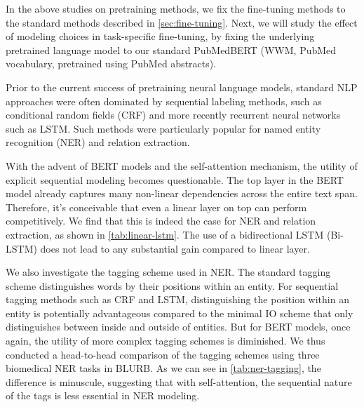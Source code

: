 \documentclass[acmlarge,screen,nonacm]{acmart}
\begin{document}
In the above studies on pretraining methods, we fix the fine-tuning methods to the standard methods described in \autoref{sec:fine-tuning}. 
Next, we will study the effect of modeling choices in task-specific fine-tuning, by fixing the underlying pretrained language model to our standard PubMedBERT (WWM, PubMed vocabulary, pretrained using PubMed abstracts). 

Prior to the current success of pretraining neural language models, standard NLP approaches were often dominated by sequential labeling methods, such as conditional random fields (CRF) and more recently recurrent neural networks such as LSTM. Such methods were particularly popular for named entity recognition (NER) and relation extraction. 


With the advent of BERT models and the self-attention mechanism, the utility of explicit sequential modeling becomes questionable. The top layer in the BERT model already captures many non-linear dependencies across the entire text span. Therefore, it's conceivable that even a linear layer on top can perform competitively. We find that this is indeed the case for NER and relation extraction, as shown in \autoref{tab:linear-lstm}. The use of a bidirectional LSTM (Bi-LSTM) does not lead to any substantial gain compared to linear layer.

We also investigate the tagging scheme used in NER. The standard tagging scheme distinguishes words by their positions within an entity. 
For sequential tagging methods such as CRF and LSTM, distinguishing the position within an entity is potentially advantageous compared to the minimal IO scheme that only distinguishes between inside and outside of entities. But for BERT models, once again, the utility of more complex tagging schemes is diminished. We thus conducted a head-to-head comparison of the tagging schemes using three biomedical NER tasks in BLURB. 
As we can see in \autoref{tab:ner-tagging}, the difference is minuscule, suggesting that with self-attention, the sequential nature of the tags is less essential in NER modeling.
\end{document}
